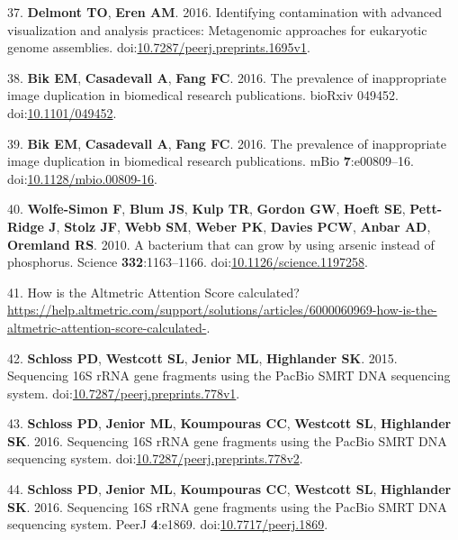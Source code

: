 \documentclass[11pt,]{article}
\begin{document}
\hypertarget{ref-Delmont2016}{}
37. \textbf{Delmont TO}, \textbf{Eren AM}. 2016. Identifying
contamination with advanced visualization and analysis practices:
Metagenomic approaches for eukaryotic genome assemblies.
doi:\href{https://doi.org/10.7287/peerj.preprints.1695v1}{10.7287/peerj.preprints.1695v1}.

\hypertarget{ref-Bik2016a}{}
38. \textbf{Bik EM}, \textbf{Casadevall A}, \textbf{Fang FC}. 2016. The
prevalence of inappropriate image duplication in biomedical research
publications. bioRxiv 049452.
doi:\href{https://doi.org/10.1101/049452}{10.1101/049452}.

\hypertarget{ref-Bik2016b}{}
39. \textbf{Bik EM}, \textbf{Casadevall A}, \textbf{Fang FC}. 2016. The
prevalence of inappropriate image duplication in biomedical research
publications. mBio \textbf{7}:e00809--16.
doi:\href{https://doi.org/10.1128/mbio.00809-16}{10.1128/mbio.00809-16}.

\hypertarget{ref-WolfeSimon2010}{}
40. \textbf{Wolfe-Simon F}, \textbf{Blum JS}, \textbf{Kulp TR},
\textbf{Gordon GW}, \textbf{Hoeft SE}, \textbf{Pett-Ridge J},
\textbf{Stolz JF}, \textbf{Webb SM}, \textbf{Weber PK}, \textbf{Davies
PCW}, \textbf{Anbar AD}, \textbf{Oremland RS}. 2010. A bacterium that
can grow by using arsenic instead of phosphorus. Science
\textbf{332}:1163--1166.
doi:\href{https://doi.org/10.1126/science.1197258}{10.1126/science.1197258}.

\hypertarget{ref-Altmetric}{}
41. How is the Altmetric Attention Score calculated?
\url{https://help.altmetric.com/support/solutions/articles/6000060969-how-is-the-altmetric-attention-score-calculated-}.

\hypertarget{ref-Schloss2015}{}
42. \textbf{Schloss PD}, \textbf{Westcott SL}, \textbf{Jenior ML},
\textbf{Highlander SK}. 2015. Sequencing 16S rRNA gene fragments using
the PacBio SMRT DNA sequencing system.
doi:\href{https://doi.org/10.7287/peerj.preprints.778v1}{10.7287/peerj.preprints.778v1}.

\hypertarget{ref-Schloss2016a}{}
43. \textbf{Schloss PD}, \textbf{Jenior ML}, \textbf{Koumpouras CC},
\textbf{Westcott SL}, \textbf{Highlander SK}. 2016. Sequencing 16S rRNA
gene fragments using the PacBio SMRT DNA sequencing system.
doi:\href{https://doi.org/10.7287/peerj.preprints.778v2}{10.7287/peerj.preprints.778v2}.

\hypertarget{ref-Schloss2016b}{}
44. \textbf{Schloss PD}, \textbf{Jenior ML}, \textbf{Koumpouras CC},
\textbf{Westcott SL}, \textbf{Highlander SK}. 2016. Sequencing 16S rRNA
gene fragments using the PacBio SMRT DNA sequencing system. PeerJ
\textbf{4}:e1869.
doi:\href{https://doi.org/10.7717/peerj.1869}{10.7717/peerj.1869}.
\end{document}
